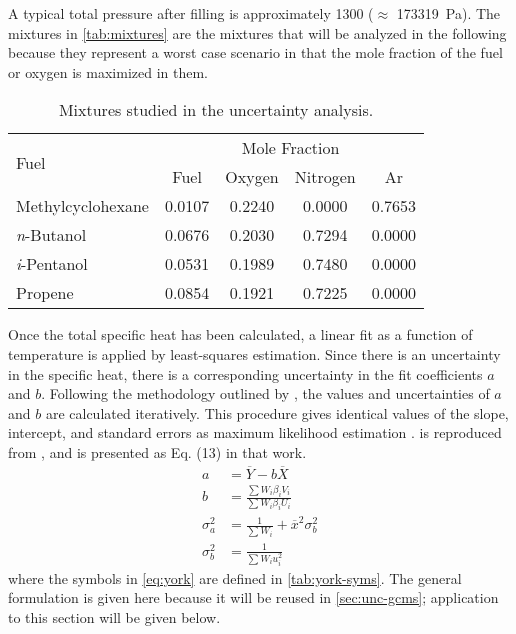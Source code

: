 \documentclass[../main.tex]{subfiles}
\begin{document}
A typical total pressure after filling is
approximately \SI{1300}{\torr} ($\approx$ \SI{173319}{\pascal}). The mixtures in
\autoref{tab:mixtures} are the mixtures that will be analyzed in the
following because they represent a worst case scenario in that the mole
fraction of the fuel or oxygen is maximized in them.

\begin{table}
\centering
\caption{Mixtures studied in the uncertainty analysis.}
\label{tab:mixtures}
\begin{tabular}{l *{4}{c}}
    \toprule
    \multirow{2}[0]{*}{Fuel} & \multicolumn{4}{c}{Mole Fraction} \\
         & Fuel & Oxygen & Nitrogen & Ar \\
    \midrule
    Methylcyclohexane   & 0.0107 & 0.2240 & 0.0000 & 0.7653 \\
    \textit{n}-Butanol  & 0.0676 & 0.2030 & 0.7294 & 0.0000 \\
    \textit{i}-Pentanol & 0.0531 & 0.1989 & 0.7480 & 0.0000 \\
    Propene             & 0.0854 & 0.1921 & 0.7225 & 0.0000 \\
    \bottomrule
    \end{tabular}
\end{table}

Once the total specific heat has been calculated, a linear fit as a function
of temperature is applied by least-squares estimation. Since there is an uncertainty
in the specific heat, there is a corresponding uncertainty in the fit
coefficients $a$ and $b$. Following the methodology outlined by
\textcite{York2004}, the values and uncertainties of $a$ and $b$
are calculated iteratively. This procedure gives identical values of the
slope, intercept, and standard errors as maximum likelihood estimation \cite{York2004}.
 is reproduced from \textcite{York2004}, and is presented
as Eq. (13) in that work.
%
\begin{subequations}
\label{eq:york}
\begin{align}
a &= \overline{Y} - b\overline{X}  \label{eq:intercept}\\
b &= \frac{\sum W_i \beta_i V_i}{\sum W_i \beta_i U_i} \label{eq:slope}\\
\sigma_a^2 &= \frac{1}{\sum W_i} + \overline{x}^2\sigma_b^2 \label{eq:unc-intercept}\\
\sigma_b^2 &= \frac{1}{\sum W_i u_i^2} \label{eq:unc-slope}
\end{align}
\end{subequations}
%
where the symbols in \autoref{eq:york} are defined in \autoref{tab:york-syms}.
The general formulation is given here because it will be reused in
\autoref{sec:unc-gcms}; application to this section will
be given below.
\end{document}
